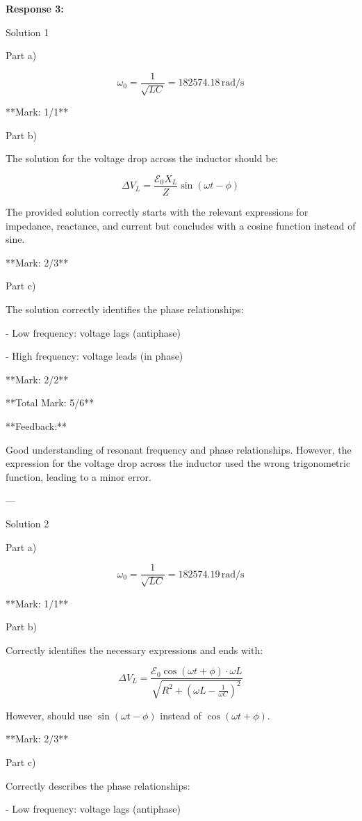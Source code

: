 \documentclass[a4paper,11pt]{article}
\begin{document}
\bigskip
\textbf{Response 3:}

Solution 1

Part a)

\[ \omega_0 = \frac{1}{\sqrt{LC}} = 182574.18 \, \text{rad/s} \]

**Mark: 1/1**

Part b)

The solution for the voltage drop across the inductor should be:

\[ \Delta V_L = \frac{\mathcal{E}_0 X_L}{Z} \sin(\omega t - \phi) \]

The provided solution correctly starts with the relevant expressions for impedance, reactance, and current but concludes with a cosine function instead of sine. 

**Mark: 2/3**

Part c)

The solution correctly identifies the phase relationships:

- Low frequency: voltage lags (antiphase)

- High frequency: voltage leads (in phase)

**Mark: 2/2**

**Total Mark: 5/6**

**Feedback:**

Good understanding of resonant frequency and phase relationships. However, the expression for the voltage drop across the inductor used the wrong trigonometric function, leading to a minor error.

---

Solution 2

Part a)

\[ \omega_0 = \frac{1}{\sqrt{LC}} = 182574.19 \, \text{rad/s} \]

**Mark: 1/1**

Part b)

Correctly identifies the necessary expressions and ends with:

\[ \Delta V_L = \frac{\mathcal{E}_0 \cos(\omega t + \phi) \cdot \omega L}{\sqrt{R^2 + (\omega L - \frac{1}{\omega C})^2}} \]

However, should use \(\sin(\omega t - \phi)\) instead of \(\cos(\omega t + \phi)\).

**Mark: 2/3**

Part c)

Correctly describes the phase relationships:

- Low frequency: voltage lags (antiphase)
\end{document}
